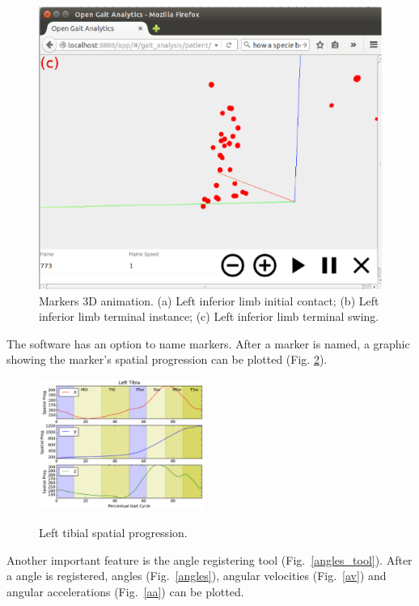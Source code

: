 \documentclass[journal]{IEEEtran}
\begin{document}
\begin{figure}[tb]
\begin{minipage}[b]{0.32\textwidth}
    \includegraphics[width=\textwidth]{./animation3.eps}
  \end{minipage}
  \caption{Markers 3D animation. 
	  (a) Left inferior limb initial contact;
	  (b) Left inferior limb terminal instance;
	  (c) Left inferior limb terminal swing.
  }
  \label{animation}
\end{figure}

The software has an option to name markers. After a marker is named, a graphic showing the 
marker's spatial progression can be plotted (Fig. \ref{spatial_progression}). 
\begin{figure}[!t]
	\centering
	{\includegraphics[width=0.48\textwidth]{./spatial_progression.eps}}
	\caption{Left tibial spatial progression.}
	\label{spatial_progression}
\end{figure}

Another important feature is the angle registering tool (Fig.~\ref{angles_tool}). 
After a angle is registered, angles (Fig.~\ref{angles}), angular velocities (Fig.~\ref{av}) 
and angular accelerations (Fig.~\ref{aa}) can be plotted.
\end{document}
